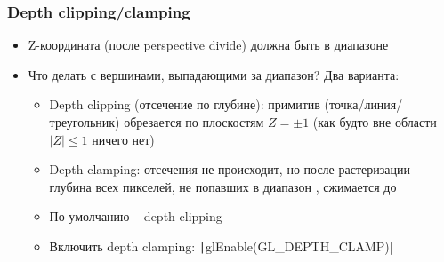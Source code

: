 \documentclass[10pt]{beamer}
\begin{document}
\begin{frame}[fragile]
\frametitle{Depth clipping/clamping}
\begin{itemize}
\item Z-координата (после perspective divide) должна быть в диапазоне \begin{math}[-1, 1]\end{math}
\pause
\item Что делать с вершинами, выпадающими за диапазон? Два варианта:
\pause
\begin{itemize}
\item Depth clipping (отсечение по глубине): примитив (точка/линия/треугольник) обрезается по плоскостям \begin{math}Z = \pm 1\end{math} (как будто вне области \begin{math}|Z|\leq 1\end{math} ничего нет)
\pause
\item Depth clamping: отсечения не происходит, но после растеризации глубина всех пикселей, не попавших в диапазон \begin{math}[-1, 1]\end{math}, сжимается до \begin{math}[-1, 1]\end{math}
\pause
\item По умолчанию -- depth clipping
\item Включить depth clamping: \texttt|glEnable(GL_DEPTH_CLAMP)|
\end{itemize}
\end{itemize}
\end{frame}
\end{document}
